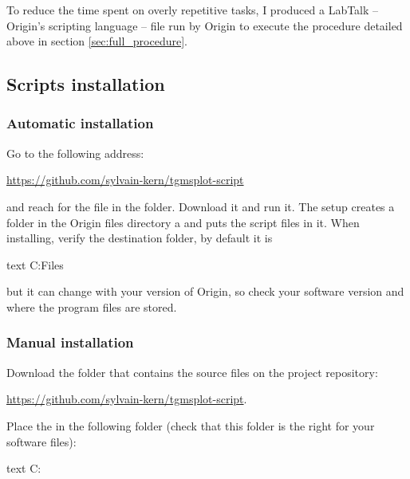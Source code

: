 \documentclass[a4paper, 11pt, raggedright, parskip, sans, colorful]{tufte-style-article}
\begin{document}
To reduce the time spent on overly repetitive tasks, I produced a LabTalk -- Origin's scripting language -- file run by Origin to execute the procedure detailed above in section \ref{sec:full_procedure}.


\subsection{Scripts installation}

\subsubsection{Automatic installation}
Go to the following address:

\noindent\url{https://github.com/sylvain-kern/tgmsplot-script}

\noindent and reach for the  file in the  folder. Download it and run it. The setup creates a  folder in the Origin files directory a and puts the script files in it. When installing, verify the destination folder, by default it is
\begin{codebox}{text}
C:\Program Files\OriginLab{}
\end{codebox}
but it can change with your version of Origin, so check your software version and where the program files are stored.

\subsubsection{Manual installation}
Download the folder that contains the source files on the project repository:

\noindent\url{https://github.com/sylvain-kern/tgmsplot-script}.

Place the  in the following folder (check that this folder is the right for your software files):

%
\begin{codebox}{text}
C:\ProgramFiles\OriginLab{}\
\end{codebox}
\end{document}
